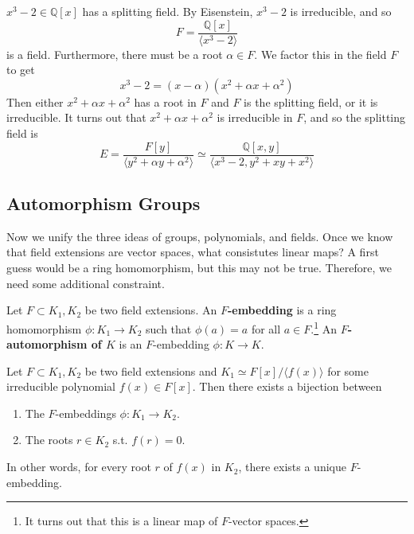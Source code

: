   \begin{example}
    $x^3 - 2 \in \mathbb{Q}[x]$ has a splitting field. By Eisenstein, $x^3 - 2$ is irreducible, and so 
    \begin{equation}
      F = \frac{\mathbb{Q}[x]}{\langle x^3 - 2 \rangle} 
    \end{equation}
    is a field. Furthermore, there must be a root $\alpha \in F$. We factor this in the field $F$ to get 
    \begin{equation}
      x^3 - 2 = (x - \alpha) (x^2 + \alpha x + \alpha^2) 
    \end{equation}
    Then either $x^2 + \alpha x + \alpha^2$ has a root in $F$ and $F$ is the splitting field, or it is irreducible. It turns out that $x^2 + \alpha x + \alpha^2$ is irreducible in $F$, and so the splitting field is 
    \begin{equation}
      E = \frac{F[y]}{\langle y^2 + \alpha y + \alpha^2 \rangle} \simeq \frac{\mathbb{Q}[x, y]}{\langle x^3 - 2, y^2 + xy + x^2 \rangle}
    \end{equation}
  \end{example}

\subsection{Automorphism Groups} 

  Now we unify the three ideas of groups, polynomials, and fields. Once we know that field extensions are vector spaces, what consistutes linear maps? A first guess would be a ring homomorphism, but this may not be true. Therefore, we need some additional constraint. 

  \begin{definition}
    Let $F \subset K_1, K_2$ be two field extensions. An \textbf{$F$-embedding} is a ring homomorphism $\phi: K_1 \to K_2$ such that $\phi(a) = a$ for all $a \in F$.\footnote{It turns out that this is a linear map of $F$-vector spaces.} An \textbf{$F$-automorphism of $K$} is an $F$-embedding $\phi: K \to K$. 
  \end{definition}

  \begin{lemma}
    Let $F \subset K_1, K_2$ be two field extensions and $K_1 \simeq F[x] / \langle f(x) \rangle$ for some irreducible polynomial $f(x) \in F[x]$. Then there exists a bijection between 
    \begin{enumerate}
      \item The $F$-embeddings $\phi: K_1 \to K_2$. 
      \item The roots $r \in K_2$ s.t. $f(r) = 0$. 
    \end{enumerate}
    In other words, for every root $r$ of $f(x)$ in $K_2$, there exists a unique $F$-embedding. 
  \end{lemma}

